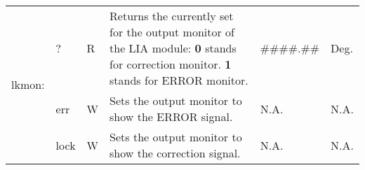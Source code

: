 \begin{center}
\begin{longtable}{| m{} | m{} | m{} | m{} | m{}| m{} |}
    \multirow{3}{0.1\textwidth}{lkmon:}  & ? & R & Returns the currently set for the output monitor of the LIA module:
                                                \newline \textbf{0} stands for correction monitor.
                                                \newline \textbf{1} stands for ERROR monitor. &  \#\#\#\#.\#\# & Deg. \\
                                        \cline{2-6}
                                        &  err & W & Sets the output monitor to show the ERROR signal. & N.A. & N.A. \\
                                        \cline{2-6}
                                        &  lock & W & Sets the output monitor to show the correction signal. & N.A. & N.A. \\
    \hline
    

\end{longtable}
\end{center}
